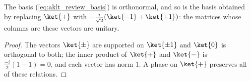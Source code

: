 \begin{lemma}\label{thm:aklt_review_basis_unitary}
    \leanok
    The basis (\ref{eq:aklt_review_basis}) is orthonormal, and so is the basis
    obtained by replacing $\ket{+}$ with $-\frac{i}{\sqrt2}(\ket{-1}+\ket{+1})$:
    the matrices whose columns are these vectors are unitary.
\end{lemma}
\begin{proof}
    \leanok
    The vectors $\ket{\pm}$ are supported on $\ket{\pm1}$ and $\ket{0}$ is
    orthogonal to both; the inner product of $\ket{+}$ and $\ket{-}$ is
    $\frac{-i}{2}(1-1)=0$, and each vector has norm $1$. A phase on $\ket{+}$
    preserves all of these relations.
\end{proof}

